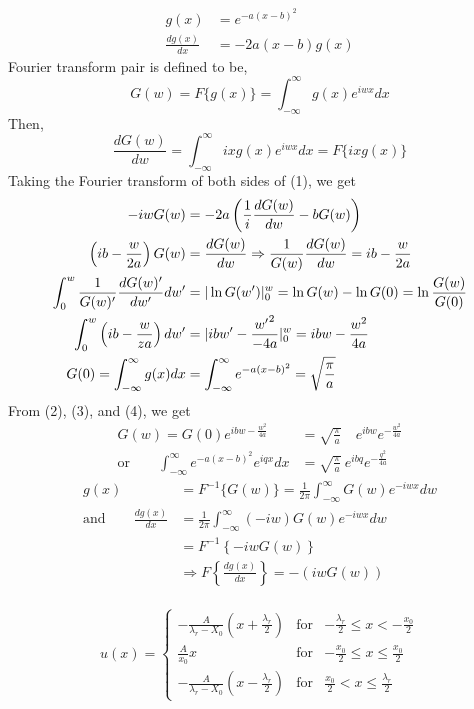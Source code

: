 \documentclass[letterpage]{article}
\begin{document}
\begin{align}
  g(x)&=e^{-a(x-b)^2}\\
  \frac{dg(x)}{dx}& = -2a(x-b)g(x)
\end{align}
Fourier transform pair is defined to be,
\begin{equation}
  G(w) = F\{g(x)\} = \int_{-\infty}^\infty g(x)e^{iwx}dx
\end{equation}
Then,
\begin{equation}
  \frac{dG(w)}{dw} = \int_{-\infty}^\infty ixg(x)e^{iwx}dx = F\{ixg(x)\}
\end{equation}
Taking the Fourier transform of both sides of (1), we get
\begin{align}
  -iwG(w) &= -2a \left(\frac{1}{i} \frac{dG(w)}{dw} - bG(w)\right)\\
  \left(ib-\frac{w}{2a}\right) G(w) &= \frac{dG(w)}{dw} \Rightarrow
  \frac{1}{G(w)} \frac{dG(w)}{dw} = ib-\frac{w}{2a}\\
  \int_0^w \frac{1}{G(w)'} \frac{dG(w)'}{dw'} dw' &= 
  \arrowvert\ln G(w')\arrowvert_0^w = \ln G(w) - \ln G(0) 
  = \ln \frac{G(w)}{G(0)}\\
  \int_0^w \left(ib-\frac{w}{za}\right)dw' &= \arrowvert ibw' - \frac{{w'}^2}{-4a}
  \arrowvert_0^w = ibw-\frac{w^2}{4a}\\
  G(0) = \int_{-\infty}^\infty g(x) dx &= \int_{-\infty}^\infty e^{-a(x-b)^2}
  = \sqrt{\frac{\pi}{a}}
\end{align}
From (2), (3), and (4), we get
\begin{align}
  G(w) = G(0) e^{ibw-\frac{w^2}{4a}} &= \sqrt{\frac{\pi}{a}} \quad e^{ibw} 
  e^{-\frac{w^2}{4a}}\\
  \text{or} \qquad
  \int_{-\infty}^\infty e^{-a(x-b)^2} e^{iqx}dx &= \sqrt{\frac{\pi}{a}}
  \: e^{ibq} e^{-\frac{q^2}{4a}}
\end{align}
\begin{align}
  g(x) &= F^{-1} \{G(w)\} = \frac{1}{2\pi} \int_{-\infty}^\infty 
  G(w)e^{-iwx}dw\\
  \text{and} \qquad \frac{dg(x)}{dx} &= \frac{1}{2\pi} \int_{-\infty}^\infty
  (-iw)G(w)e^{-iwx}dw\\
  &=F^{-1} \left\{-iwG(w)\right\}\\
  &\Rightarrow F\left\{\frac{dg(x)}{dx} \right\} = -(iwG(w))
\end{align}
\\
\begin{equation*}
  u(x) = \left\{
    \begin{array}{ccc}
    -\frac{A}{\lambda_r-X_0}\left(x+\frac{\lambda_r}{2}\right) 
      & \text{for} 
      & -\frac{\lambda_r}{2} \leq x < -\frac{x_0}{2} \\
    \frac{A}{x_0}x 
      & \text{for} 
      & -\frac{x_0}{2} \leq x \leq \frac{x_0}{2} \\
    -\frac{A}{\lambda_r-X_0} \left(x-\frac{\lambda_r}{2}\right)
      & \text{for} 
      & \frac{x_0}{2} < x \leq \frac{\lambda_r}{2}
    \end{array} \right.
\end{equation*}
\end{document}
